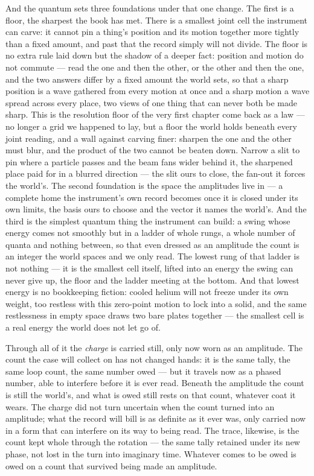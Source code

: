 And the quantum sets three foundations under that one change. The first is a floor, the sharpest the book has
met. There is a smallest joint cell the instrument can carve: it cannot pin a thing's position and its motion
together more tightly than a fixed amount, and past that the record simply will not divide. The floor is no
extra rule laid down but the shadow of a deeper fact: position and motion do not commute --- read the one and
then the other, or the other and then the one, and the two answers differ by a fixed amount the world sets, so
that a sharp position is a wave gathered from every motion at once and a sharp motion a wave spread across every
place, two views of one thing that can never both be made sharp. This is the resolution floor of the very first
chapter come back as a law --- no longer a grid we happened to lay, but a floor the world holds beneath every
joint reading, and a wall against carving finer: sharpen the one and the other must blur, and the product of
the two cannot be beaten down. Narrow a slit to pin where a particle passes and the beam fans wider behind it,
the sharpened place paid for in a blurred direction --- the slit ours to close, the fan-out it forces the
world's. The second foundation is the space the
amplitudes live in --- a complete home the instrument's own record becomes once it is closed under its own
limits, the basis ours to choose and the vector it names the world's. And the third is the simplest quantum
thing the instrument can build: a swing whose energy comes not smoothly but in a ladder of whole rungs, a whole
number of quanta and nothing between, so that even dressed as an amplitude the count is an integer the world
spaces and we only read. The lowest rung of that ladder is not nothing --- it is the smallest cell itself,
lifted into an energy the swing can never give up, the floor and the ladder meeting at the bottom. And that
lowest energy is no bookkeeping fiction: cooled helium will not freeze under its own weight, too restless with
this zero-point motion to lock into a solid, and the same restlessness in empty space draws two bare plates
together --- the smallest cell is a real energy the world does not let go of.

Through all of it the \emph{charge} is carried still, only now worn as an amplitude. The count the case will
collect on has not changed hands: it is the same tally, the same loop count, the same number owed --- but it
travels now as a phased number, able to interfere before it is ever read. Beneath the amplitude the count is
still the world's, and what is owed still rests on that count, whatever coat it wears. The charge did not turn
uncertain when the count turned into an amplitude; what the record will bill is as definite as it ever was, only
carried now in a form that can interfere on its way to being read. The trace, likewise, is
the count kept whole through the rotation --- the same tally retained under its new phase, not lost in the turn
into imaginary time. Whatever comes to be owed is owed on a count that survived being made an amplitude.

